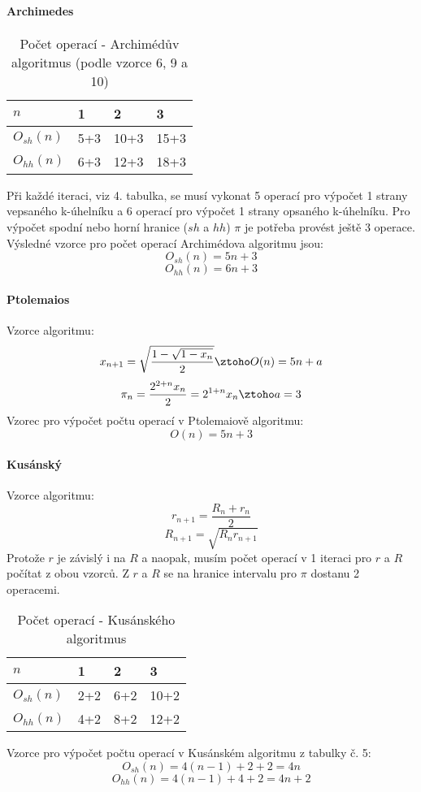 \documentclass[soc]{gzwroc} %
\begin{document}
\paragraph{Archimedes}
\begin{table}[h!]
\caption{Počet operací - Archimédův algoritmus (podle vzorce 6, 9 a 10)}
\begin{tabular}{|l||l|l|l|}
\hline
$n$ & 1&2&3 \\ \hline
$O_{sh}(n)$&5+3&10+3&15+3 \\ \hline
$O_{hh}(n)$&6+3&12+3&18+3 \\ \hline
\end{tabular}
\end{table}
Při každé iteraci, viz 4. tabulka, se musí vykonat 5 operací pro výpočet 1 strany vepsaného k-úhelníku a 6 operací pro výpočet 1 strany opsaného k-úhelníku. Pro výpočet spodní nebo horní hranice ($sh$ a $hh$) $\pi$ je potřeba provést ještě 3 operace. Výsledné vzorce pro počet operací Archimédova algoritmu jsou:
$$
O_{sh}(n)=5n+3
$$
$$
O_{hh}(n)=6n+3
$$
\paragraph{Ptolemaios}
Vzorce algoritmu:
$$
x_{n+1}=\sqrt{\frac{1-\sqrt{1-x_n}}{2}} \ztoho O(n)=5n+a
$$
$$
\pi_n=\frac{2^{2+n}x_n}{2}=2^{1+n}x_n \ztoho a=3
$$
Vzorec pro výpočet počtu operací v Ptolemaiově algoritmu:
$$
O(n)=5n+3
$$
\paragraph{Kusánský}
Vzorce algoritmu:
$$
r_{n+1}=\frac{R_n+r_n}{2}
$$
$$
R_{n+1}=\sqrt{R_nr_{n+1}}
$$
Protože $r$ je závislý i na $R$ a naopak, musím počet operací v 1 iteraci pro $r$ a $R$ počítat z obou vzorců.  Z $r$ a $R$ se na hranice intervalu pro $\pi$ dostanu 2 operacemi.
\begin{table}[h!]
\caption{Počet operací - Kusánského algoritmus}
\begin{tabular}{|l||l|l|l|}
\hline
$n$ & 1&2&3 \\ \hline
$O_{sh}(n)$&2+2&6+2&10+2 \\ \hline
$O_{hh}(n)$&4+2&8+2&12+2 \\ \hline
\end{tabular}
\end{table}
Vzorce pro výpočet počtu operací v Kusánském algoritmu z tabulky č. 5:
$$
O_{sh}(n)=4(n-1)+2+2=4n
$$
$$
O_{hh}(n)=4(n-1)+4+2=4n+2
$$
\end{document}
